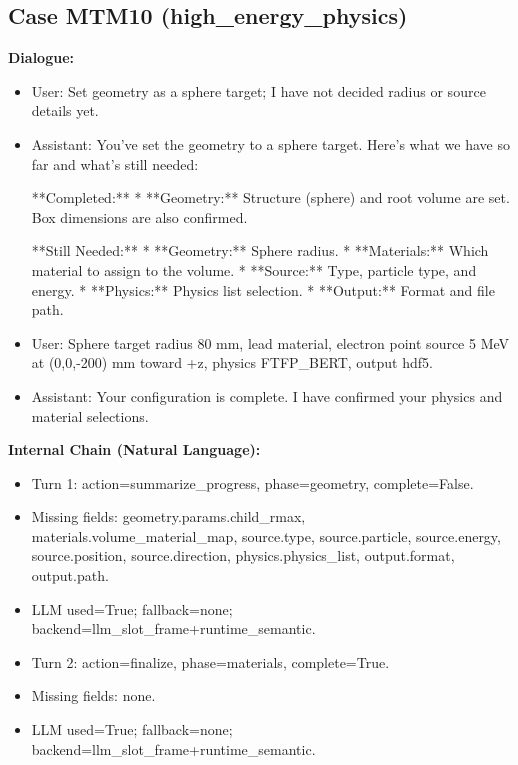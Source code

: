 \documentclass[11pt]{ctexart}
\begin{document}
\subsection{Case MTM10 (high\_energy\_physics)}
\textbf{Dialogue:}
\begin{itemize}
\item User: Set geometry as a sphere target; I have not decided radius or source details yet.
\item Assistant: You've set the geometry to a sphere target. Here's what we have so far and what's still needed:

**Completed:**
*   **Geometry:** Structure (sphere) and root volume are set. Box dimensions are also confirmed.

**Still Needed:**
*   **Geometry:** Sphere radius.
*   **Materials:** Which material to assign to the volume.
*   **Source:** Type, particle type, and energy.
*   **Physics:** Physics list selection.
*   **Output:** Format and file path.
\item User: Sphere target radius 80 mm, lead material, electron point source 5 MeV at (0,0,-200) mm toward +z, physics FTFP\_BERT, output hdf5.
\item Assistant: Your configuration is complete. I have confirmed your physics and material selections.
\end{itemize}
\textbf{Internal Chain (Natural Language):}
\begin{itemize}
\item Turn 1: action=summarize\_progress, phase=geometry, complete=False.
\item Missing fields: geometry.params.child\_rmax, materials.volume\_material\_map, source.type, source.particle, source.energy, source.position, source.direction, physics.physics\_list, output.format, output.path.
\item LLM used=True; fallback=none; backend=llm\_slot\_frame+runtime\_semantic.
\item Turn 2: action=finalize, phase=materials, complete=True.
\item Missing fields: none.
\item LLM used=True; fallback=none; backend=llm\_slot\_frame+runtime\_semantic.
\end{itemize}
\end{document}
